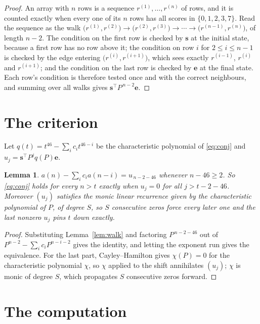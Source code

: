 \documentclass[11pt,a4paper]{article}
\theoremstyle{plain}
\newtheorem{lemma}[theorem]{Lemma}
\theoremstyle{definition}
\begin{document}
\begin{proof}
An array with $n$ rows is a sequence $r^{(1)},\dots,r^{(n)}$ of rows, and it is counted
exactly when every one of its $n$ rows has all scores in $\{0,1,2,3,7\}$. Read the sequence as the
walk $\bigl(r^{(1)},r^{(2)}\bigr)\to\bigl(r^{(2)},r^{(3)}\bigr)\to\cdots\to
\bigl(r^{(n-1)},r^{(n)}\bigr)$, of length $n-2$. The condition on the first row is
checked by $\mathbf{s}$ at the initial state, because a first row has no row above it; the
condition on row $i$ for $2\le i\le n-1$ is checked by the edge entering
$\bigl(r^{(i)},r^{(i+1)}\bigr)$, which sees exactly $r^{(i-1)}$, $r^{(i)}$ and
$r^{(i+1)}$; and the condition on the last row is checked by $\mathbf{e}$ at the final
state. Each row's condition is therefore tested once and with the correct neighbours, and
summing over all walks gives $\mathbf{s}^{\!\top}P^{\,n-2}\mathbf{e}$.
\end{proof}

\section{The criterion}

Let $q(t)=t^{46}-\sum_i c_i t^{46-i}$ be the characteristic polynomial of
\eqref{eq:conj} and $u_j=\mathbf{s}^{\!\top}P^{j}q(P)\mathbf{e}$.

\begin{lemma}\label{lem:crit}
$a(n)-\sum_i c_i a(n-i)=u_{\,n-2-46}$ whenever $n-46\ge2$. So \eqref{eq:conj}
holds for every $n>t$ exactly when $u_j=0$ for all $j>t-2-46$. Moreover $(u_j)$
satisfies the monic linear recurrence given by the characteristic polynomial of $P$, of
degree $S$, so $S$ consecutive zeros force every later one and the last nonzero $u_j$ pins
$t$ down exactly.
\end{lemma}

\begin{proof}
Substituting Lemma~\ref{lem:walk} and factoring $P^{\,n-2-46}$ out of
$P^{n-2}-\sum_i c_i P^{n-i-2}$ gives the identity, and letting the exponent run gives the
equivalence. For the last part, Cayley--Hamilton gives $\chi(P)=0$ for the characteristic
polynomial $\chi$, so $\chi$ applied to the shift annihilates $(u_j)$; $\chi$ is monic of
degree $S$, which propagates $S$ consecutive zeros forward.
\end{proof}

\section{The computation}
\end{document}
